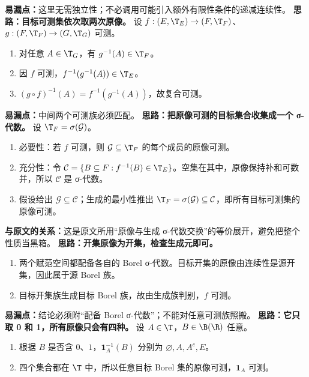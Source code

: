 \textbf{易漏点：}这里无需独立性；不必调用可能引入额外有限性条件的递减连续性。
\textbf{思路：目标可测集依次取两次原像。}
设 $f:(E,\T_E)\to(F,\T_F)$、$g:(F,\T_F)\to(G,\T_G)$ 可测。
\begin{enumerate}
\item 对任意 $A\in\T_G$，有 $g^{-1}(A)\in\T_F$。
\item 因 $f$ 可测，$f^{-1}(g^{-1}(A))\in\T_E$。
\item $(g\circ f)^{-1}(A)=f^{-1}(g^{-1}(A))$，故复合可测。
\end{enumerate}
\textbf{易漏点：}中间两个可测族必须匹配。
\textbf{思路：把原像可测的目标集合收集成一个 σ-代数。}
设 $\T_F=\sigma(\mathcal G)$。
\begin{enumerate}
\item 必要性：若 $f$ 可测，则 $\mathcal G\subseteq\T_F$ 的每个成员的原像可测。
\item 充分性：令 $\mathcal C=\{B\subseteq F:f^{-1}(B)\in\T_E\}$。空集在其中，原像保持补和可数并，所以 $\mathcal C$ 是 σ-代数。
\item 假设给出 $\mathcal G\subseteq\mathcal C$；生成的最小性推出 $\T_F=\sigma(\mathcal G)\subseteq\mathcal C$，即所有目标可测集的原像可测。
\end{enumerate}
\textbf{与原文的关系：}这是原文所用“原像与生成 σ-代数交换”的等价展开，避免把整个性质当黑箱。
\textbf{思路：开集原像为开集，检查生成元即可。}
\begin{enumerate}
\item 两个赋范空间都配备各自的 Borel σ-代数。目标开集的原像由连续性是源开集，因此属于源 Borel 族。
\item 目标开集族生成目标 Borel 族，故由生成族判别，$f$ 可测。
\end{enumerate}
\textbf{易漏点：}结论必须附“配备 Borel σ-代数”；不能对任意可测族照搬。
\textbf{思路：它只取 0 和 1，所有原像只会有四种。}
设 $A\in\T$，$B\in\B(\R)$ 任意。
\begin{enumerate}
\item 根据 $B$ 是否含 $0$、$1$，$\mathbf1_A^{-1}(B)$ 分别为 $\varnothing,A,A^c,E$。
\item 四个集合都在 $\T$ 中，所以任意目标 Borel 集的原像可测，$\mathbf1_A$ 可测。
\end{enumerate}
